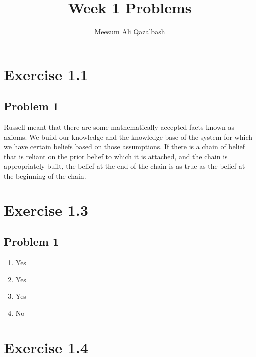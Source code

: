 \documentclass[answers]{exam}
\title{Week 1 Problems}
\author{Meesum Ali Qazalbash}
\theoremstyle{mytheoremstyle}
\theoremstyle{mytheoremstyle}
\theoremstyle{myproblemstyle}
\begin{document}
\maketitle

\section*{Exercise 1.1}

\subsection*{Problem 1}
\begin{framed}
	Russell meant that there are some mathematically accepted facts known as axioms. We build our knowledge and the knowledge base of the system for which we have certain beliefs based on those assumptions. If there is a chain of belief that is reliant on the prior belief to which it is attached, and the chain is appropriately built, the belief at the end of the chain is as true as the belief at the beginning of the chain.
\end{framed}

\section*{Exercise 1.3}

\subsection*{Problem 1}
\begin{framed}
	\begin{enumerate}
		\item Yes
		\item Yes
		\item Yes
		\item No
	\end{enumerate}
\end{framed}

\section*{Exercise 1.4}
\end{document}
